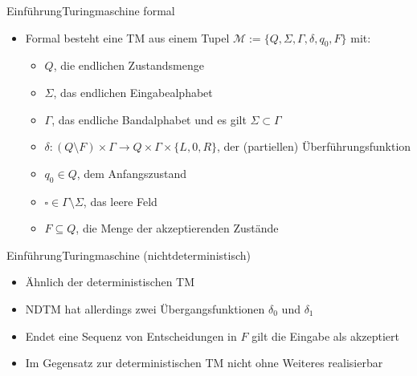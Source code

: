 \documentclass[ignorenonframetext,]{beamer}
\begin{document}
\begin{frame}{Einführung}{Turingmaschine formal}

\begin{itemize}
\itemsep1pt\parskip0pt
\item
  Formal besteht eine TM aus einem Tupel
  $\mathcal{M}:=\{ Q, \Sigma, \Gamma, \delta, q_0, F \}$ mit:

  \begin{itemize}
  \itemsep1pt\parskip0pt
  \item
    $Q$, die endlichen Zustandsmenge
  \item
    $\Sigma$, das endlichen Eingabealphabet
  \item
    $\Gamma$, das endliche Bandalphabet und es gilt
    $\Sigma \subset \Gamma$
  \item
    $\delta\colon (Q \setminus F)\times \Gamma \to Q \times \Gamma \times \{L, 0, R\}$,
    der (partiellen) Überführungsfunktion
  \item
    $q_0 \in Q$, dem Anfangszustand
  \item
    $\square \in \Gamma\setminus\Sigma$, das leere Feld
  \item
    $F \subseteq Q$, die Menge der akzeptierenden Zustände
  \end{itemize}
\end{itemize}

\end{frame}

\begin{frame}{Einführung}{Turingmaschine (nichtdeterministisch)}

\begin{itemize}
\itemsep1pt\parskip0pt
\item
  Ähnlich der deterministischen TM
\item
  NDTM hat allerdings zwei Übergangsfunktionen $\delta_0$ und $\delta_1$
\item
  Endet eine Sequenz von Entscheidungen in $F$ gilt die Eingabe als
  akzeptiert
\item
  Im Gegensatz zur deterministischen TM nicht ohne Weiteres realisierbar
\end{itemize}

\end{frame}
\end{document}
